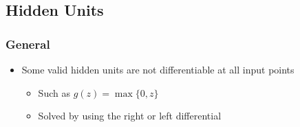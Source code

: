 \documentclass[11pt]{article}
\begin{document}
\subsection{Hidden Units}
\label{sec:orgbbe8257}
\subsubsection{General}
\label{sec:orga3b7d30}
\begin{itemize}
\item Some valid hidden units are not differentiable at all input points
\begin{itemize}
\item Such as \(g(z)=\max\{0,z\}\)
\item Solved by using the right or left differential
\end{itemize}
\end{itemize}
\end{document}
